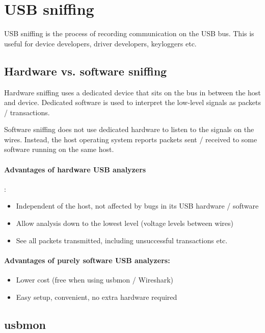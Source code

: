 \documentclass{article}
\begin{document}
\section{USB sniffing}

USB sniffing is the process of recording communication on the USB bus.
This is useful for device developers, driver developers, keyloggers etc.

\subsection{Hardware vs. software sniffing}
\label{ssec:snifferscompared}

Hardware sniffing uses a dedicated device that sits on the bus in between the
host and device. Dedicated software is used to interpret the low-level signals
as packets / transactions.

Software sniffing does not use dedicated hardware to listen to the signals
on the wires. Instead, the host operating system reports packets sent / received
to some software running on the same host.

\paragraph*{Advantages of hardware USB analyzers \cite{analyzerbenefits}}:

\begin{itemize}
\item Independent of the host, not affected by bugs in its USB hardware / software
\item Allow analysis down to the lowest level (voltage levels between wires)
\item See all packets transmitted, including unsuccessful transactions etc.
\end{itemize}

\paragraph*{Advantages of purely software USB analyzers:}

\begin{itemize}
\item Lower cost (free when using usbmon / Wireshark)
\item Easy setup, convenient, no extra hardware required
\end{itemize}

\subsection{usbmon}
\end{document}

